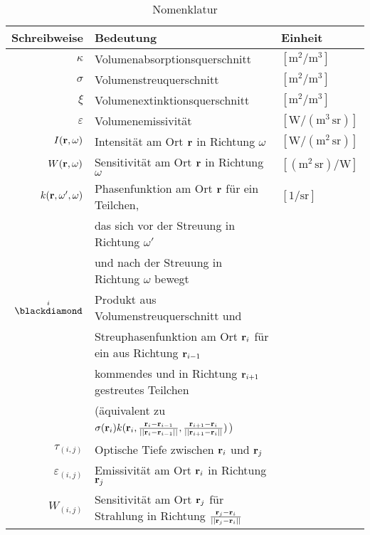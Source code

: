 	\begin{table}
		\caption{Nomenklatur}
		\begin{center}
		\begin{tabular}{rll}
			Schreibweise & Bedeutung & Einheit \\
			\hline
			$\kappa$ & Volumenabsorptionsquerschnitt & $\left[\text{m}^2/\text{m}^3\right]$ \\
			$\sigma$ & Volumenstreuquerschnitt & $\left[\text{m}^2/\text{m}^3\right]$ \\
			$\xi$ & Volumenextinktionsquerschnitt & $\left[\text{m}^2/\text{m}^3\right]$ \\
			$\varepsilon$ & Volumenemissivität & $\left[\text{W}/(\text{m}^3\,\text{sr})\right]$ \\
			$I(\mathbf{r},\omega)$ & Intensität am Ort $\mathbf{r}$ in Richtung $\omega$& $\left[\text{W}/(\text{m}^2\,\text{sr})\right]$ \\
			$W(\mathbf{r},\omega)$ & Sensitivität am Ort $\mathbf{r}$ in Richtung $\omega$ & $\left[(\text{m}^2\,\text{sr})/\text{W}\right]$ \\
			$k(\mathbf{r},\omega',\omega)$ & Phasenfunktion am Ort $\mathbf{r}$ für ein Teilchen, & $\left[1/\text{sr}\right]$ \\
				&das sich vor der Streuung in Richtung $\omega'$&\\
				&und nach der Streuung in Richtung $\omega$ bewegt& \\
			$\scatter{i}$ & Produkt aus Volumenstreuquerschnitt und&\\
			  & Streuphasenfunktion am Ort $\mathbf{r}_i$ für ein aus Richtung $\mathbf{r}_{i-1}$&\\ 
				&kommendes und in Richtung $\mathbf{r}_{i+1}$ gestreutes Teilchen&\\
				&(äquivalent zu $\sigma(\mathbf{r}_i)k(\mathbf{r}_i,\frac{\mathbf{r}_i-\mathbf{r}_{i-1}}{||\mathbf{r}_i-\mathbf{r}_{i-1}||},\frac{\mathbf{r}_{i+1}-\mathbf{r}_i}{||\mathbf{r}_{i+1}-\mathbf{r}_i||})$)& \\
			$\tau_{(i,j)}$ & Optische Tiefe zwischen $\mathbf{r}_i$ und $\mathbf{r}_j$ & \\
			$\varepsilon_{(i,j)}$ & Emissivität am Ort $\mathbf{r}_i$ in Richtung $\mathbf{r}_j$ & \\
			$W_{(i,j)}$ & Sensitivität am Ort $\mathbf{r}_j$ für Strahlung in Richtung $\frac{\mathbf{r}_j-\mathbf{r}_i}{||\mathbf{r}_j-\mathbf{r}_i||}$ &
		\end{tabular}
		\end{center}
		\label{tab:nomenklatur}
	\end{table}
